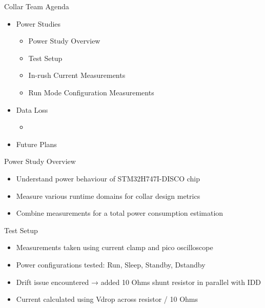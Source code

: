 \begin{frame}{Collar Team Agenda}
    \begin{itemize}
        \item Power Studies
        \begin{itemize}
            \item Power Study Overview
            \item Test Setup 
            \item In-rush Current Measurements
            \item Run Mode Configuration Measurements
        \end{itemize}
        \item Data Loss
        \begin{itemize}
            \item 
        \end{itemize}
        \item Future Plans
    \end{itemize}
\end{frame}
     
\begin{frame}{Power Study Overview}
    \begin{itemize}
        \item Understand power behaviour of STM32H747I-DISCO chip
        \item Measure various runtime domains for collar design metrics
        \item Combine measurements for a total power consumption estimation
    \end{itemize}
\end{frame}

\begin{frame}{Test Setup}
    \begin{itemize}
        \item Measurements taken using current clamp and pico oscilloscope
        \item Power configurations tested: Run, Sleep, Standby, Dstandby
        \item Drift issue encountered → added 10 Ohms shunt resistor in parallel with IDD
        \item Current calculated using Vdrop across resistor / 10 Ohms
    \end{itemize}  
\end{frame}

